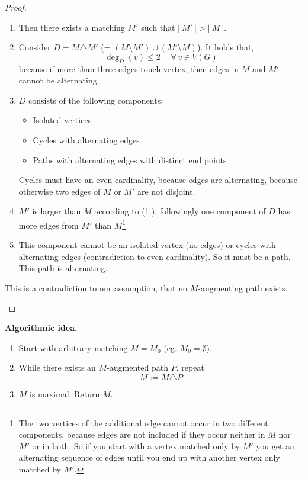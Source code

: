 \documentclass[a4paper]{article}
\theoremstyle{definition}
\newcommand{\card}[1]{\left|\:\!#1\:\!\right|}
\newcommand{\fall}{\;\forall\,}
\begin{document}
\begin{proof}
\begin{description}
      \begin{enumerate}
        \item Then there exists a matching $M'$ such that $\card{M'} > \card{M}$.
        \item Consider $D = M \triangle M'$ (= $(M \setminus M') \cup (M' \setminus M)$).
          It holds that,
          \[ \deg_{D}(v) \leq 2  \quad \fall v \in V(G) \]
          because if more than three edges touch vertex, then edges in $M$ and $M'$ cannot be alternating.
        \item $D$ consists of the following components:
          \begin{itemize}
            \item Isolated vertices
            \item Cycles with alternating edges
            \item Paths with alternating edges with distinct end points
          \end{itemize}
          Cycles must have an even cardinality, because edges are alternating,
          because otherwise two edges of $M$ or $M'$ are not disjoint.
        \item $M'$ is larger than $M$ according to (1.), followingly one component
          of $D$ has more edges from $M'$ than $M$\footnote{
          The two vertices of the additional edge cannot occur in two different components,
          because edges are not included if they occur neither in $M$ nor $M'$ or in both.
          So if you start with a vertex matched only by $M'$ you get an alternating
          sequence of edges until you end up with another vertex only matched by $M'$.}
        \item This component cannot be an isolated vertex (no edges) or cycles
          with alternating edges (contradiction to even cardinality). So it must be
          a path. This path is alternating.
      \end{enumerate}
      This is a contradiction to our assumption, that no $M$-augmenting path exists.
  \end{description}
\end{proof}

\textbf{Algorithmic idea.}
  \begin{enumerate}
    \itemsep0pt
    \item Start with arbitrary matching $M = M_0$ (eg. $M_0 = \emptyset$).
    \item While there exists an $M$-augmented path $P$, repeat
      \[ M := M \triangle P \]
    \item $M$ is maximal. Return $M$.
  \end{enumerate}
\end{document}
